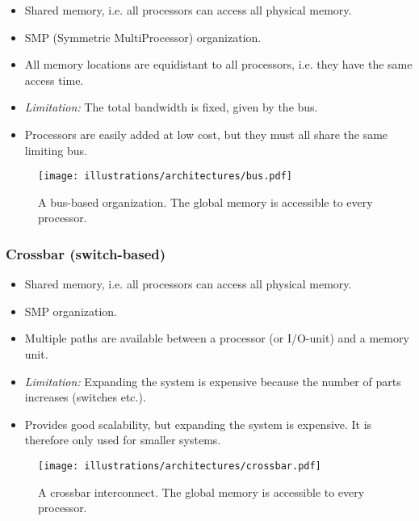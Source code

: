 \begin{itemize}
  \item Shared memory, i.e. all processors can access all physical memory.
  \item SMP (Symmetric MultiProcessor) organization.
  \item All memory locations are equidistant to all processors, i.e. they have the same access time.
  \item \emph{Limitation:} The total bandwidth is fixed, given by the bus.
  \item Processors are easily added at low cost, but they must all share the same limiting bus.
\end{itemize}

\begin{figure}[htbp]
  \centering
  \texttt{[image: illustrations/architectures/bus.pdf]}
  \caption{A bus-based organization. The global memory is accessible to every processor.}
  \label{fig:bus}
\end{figure}



\subsubsection{Crossbar (switch-based)} %

\begin{itemize}
\label{ssub:crossbar}

  \item Shared memory, i.e. all processors can access all physical memory.
  \item SMP organization.
  \item Multiple paths are available between a processor (or I/O-unit) and a memory unit.
  \item \emph{Limitation:} Expanding the system is expensive because the number of parts increases (switches etc.).
  \item Provides good scalability, but expanding the system is expensive. It is therefore only used for smaller systems.
\end{itemize}

\begin{figure}[htbp]
  \centering
  \texttt{[image: illustrations/architectures/crossbar.pdf]}
  \caption{A crossbar interconnect. The global memory is accessible to every processor.}
  \label{fig:crossbar}
\end{figure}


